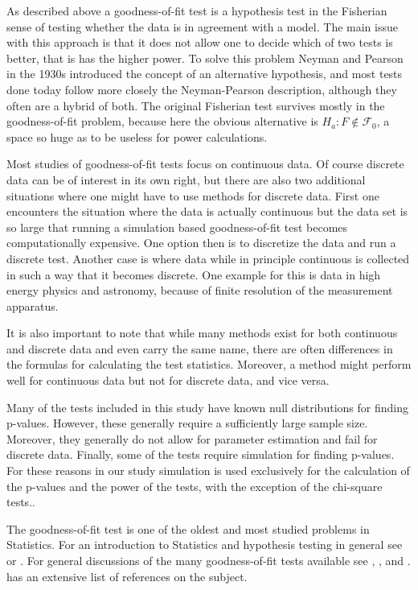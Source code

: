 \documentclass[]{svjour3}
\begin{document}
As described above a goodness-of-fit test is a hypothesis test in the
Fisherian sense of testing whether the data is in agreement with a
model. The main issue with this approach is that it does not allow one to
decide which of two tests is better, that is has the higher power. To solve this problem
Neyman and Pearson in the 1930s introduced the concept of an alternative
hypothesis, and most tests done today follow more closely the
Neyman-Pearson description, although they often are a hybrid of both.
The original Fisherian test survives mostly in the goodness-of-fit
problem, because here the obvious alternative is \(H_a: F \not\in \mathscr{F}_0\), a
space so huge as to be useless for power calculations. 

Most studies of goodness-of-fit tests focus on continuous data. Of course discrete data can be of interest in its own right, but there are also two additional situations where one might have to use methods for discrete data. First one encounters the situation where the data is actually continuous but the data set is so large that running a simulation based goodness-of-fit test becomes computationally expensive. One option then is to discretize the data and run a discrete test. Another case is where data while in principle continuous is collected in such a way that it becomes discrete. One example for this is data in high energy physics and astronomy, because of finite resolution of the measurement apparatus.

It is also important to note that while many methods exist for both continuous and discrete data and even carry the same name, there are often differences in the formulas for calculating the test statistics. Moreover, a method might perform well for continuous data but not for discrete  data, and vice versa.

Many of the tests included in this study have known null distributions for finding p-values. However, these generally require a sufficiently large sample size. Moreover, they generally do not allow for parameter estimation and fail for discrete data. Finally, some of the tests require simulation for finding p-values. For these reasons in our study simulation is used exclusively for the calculation of the p-values and the power of the tests, with the exception of the chi-square tests..

The goodness-of-fit test is one of the oldest and most studied problems in
Statistics. For an introduction to Statistics and hypothesis testing in
general see \citet{casella2002} or \citet{bickel2015}. For general discussions of the many
goodness-of-fit tests available see \citet{agostini1986}, \citet{raynor2009}, \citet{zhang2002} and  \citet{thas2010}. \citet{thas2010} has an extensive list of references on the subject. 
\end{document}
